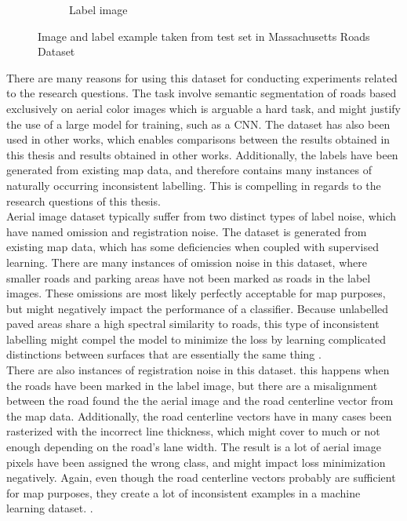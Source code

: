 \begin{figure}
\begin{subfigure}{0.48\textwidth}
\caption{Label image} \label{fig:mass_roads_example_label}
\end{subfigure}
\hspace*{\fill} %
\caption{Image and label example taken from test set in Massachusetts Roads Dataset} \label{fig:mass_roads_example}
\end{figure}


There are many reasons for using this dataset for conducting experiments related to the research questions.  The task involve semantic segmentation of roads based exclusively on aerial color images which is arguable a hard task, and might justify the use of a large model for training, such as a \ac{CNN}. The dataset has also been used in other works, which enables comparisons between the results obtained in this thesis and results obtained in other works. Additionally, the labels have been generated from existing map data, and therefore contains many instances of naturally occurring inconsistent labelling. This is compelling in regards to  the research questions of this thesis.\\

Aerial image dataset typically suffer from two distinct types of label noise, which \cite{Mnih_aerial_images_noisy} have named omission and registration noise. The dataset is generated from existing map data, which has some deficiencies when coupled with supervised learning. There are many instances of omission noise in this dataset, where smaller roads and parking areas have not been marked as roads in the label images. These omissions are most likely perfectly acceptable for map purposes, but might negatively impact the performance of a classifier.  Because unlabelled paved areas share a high spectral similarity to roads, this type of inconsistent labelling might compel the model to minimize the loss by learning complicated distinctions between surfaces that are essentially the same thing .\\

There are also instances of registration noise in this dataset. this happens when the roads have been marked in the label image, but there are a misalignment between the road found the the aerial image and the road centerline vector from the map data. Additionally, the road centerline vectors have in many cases been rasterized with the incorrect line thickness, which might cover to much or not enough depending on the road's lane width. The result is a lot of aerial image pixels have been assigned the wrong class, and might impact loss minimization negatively. Again, even though the road centerline vectors probably are sufficient for map purposes, they create a lot of inconsistent examples in a machine learning dataset. .


